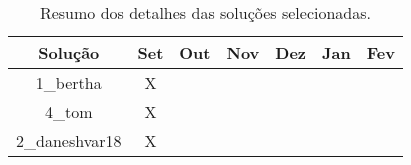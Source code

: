 \begin{table}[!thb]
    \centering
    \caption{Resumo dos detalhes das soluções selecionadas.}
    \begin{adjustbox}{max width={\textwidth},keepaspectratio}%
    \begin{tabular}{|c|c|c|c|c|c|c|}
        \toprule
        Solução 
        & Set & Out & Nov & Dez & Jan & Fev
        \\ \hline
        1\_bertha        
        & X   &     &     &     &     &     
        \\ \hline
        4\_tom
        & X   &     &     &     &     &     
        \\ \hline
        2\_daneshvar18
        & X   &     &     &     &     &          
        \\ 
        \bottomrule
    \end{tabular}
    \end{adjustbox}
    \label{tab:resumo-soluções} 
\end{table}